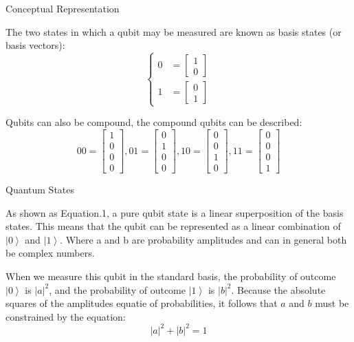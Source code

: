 \documentclass[UTF8,beamer,serif,ctexart]{beamer}
\begin{document}
\begin{frame}{Conceptual Representation}{}
	\par The two states in which a qubit may be measured are known as basis states (or basis vectors):
	\begin{equation}
		\left\{
		\begin{aligned}
			0 & = \begin{bmatrix} 1 \\ 0 \end{bmatrix} \\
			1 & = \begin{bmatrix} 0 \\ 1 \end{bmatrix} 
		\end{aligned}
		\right.
	\end {equation}
	\par Qubits can also be compound, the compound qubits can be described:
	\begin{equation}
			00 = \begin{bmatrix} 1 \\ 0 \\ 0 \\ 0 \end{bmatrix} ,
			01 = \begin{bmatrix} 0 \\ 1 \\ 0 \\ 0 \end{bmatrix} ,
			10 = \begin{bmatrix} 0 \\ 0 \\ 1 \\ 0 \end{bmatrix} ,
			11 = \begin{bmatrix} 0 \\ 0 \\ 0 \\ 1 \end{bmatrix} 
	\end {equation}	
\end{frame}

\begin{frame}{Quantum States}{}
	\par As shown as Equation.1, a pure qubit state is a linear superposition of the basis states. This means that the qubit can be represented as a linear combination of $\left| 0 \right\rangle$ and $\left| 1 \right\rangle$. Where a and b are probability amplitudes and can in general both be complex numbers.
	\par When we measure this qubit in the standard basis, the probability of outcome $\left| 0 \right\rangle$ is $|a|^{2}$, and the probability of outcome $\left| 1 \right\rangle$ is $|b|^{2}$. Because the absolute squares of the amplitudes equatie of probabilities, it follows that $a$ and $b$ must be constrained by the equation: 
	\begin{equation}
		|a|^{2}+|b|^{2}=1
	\end {equation}	
\end{frame}
\end{document}
